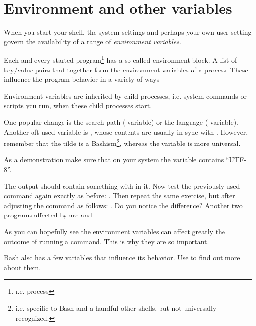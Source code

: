 \documentclass{olli-handout}
\begin{document}
\section{Environment and other variables}\label{env_vars}

\begin{refmanbash}
\end{refmanbash}

When you start your shell, the system settings and perhaps your own user setting govern the availability of a range of \emph{environment variables}.

\begin{hintbox}
{\olliHandLeft} Each and every started program\footnote{i.e. process} has a so-called environment block. A list of key/value pairs that together form the environment variables of a process. These influence the program behavior in a variety of ways.

Environment variables are inherited by child processes, i.e. system commands or scripts you run, when these child processes start.

One popular change is the search path (\label{path_var} variable) or the language ( variable). Another oft used variable is , whose contents are usually in sync with \TT{\mytilde}. However, remember that the tilde is a Bashism\footnote{i.e. specific to Bash and a handful other shells, but not universally recognized.}, whereas the  variable is more universal.
\end{hintbox}

As a demonstration make sure that on your system the  variable contains ``UTF-8''.


The output should contain something with  in it. Now test the previously used  command again exactly as before: . Then repeat the same exercise, but after adjusting the command as follows: . Do you notice the difference? Another two programs affected by  are  and .

As you can hopefully see the environment variables can affect greatly the outcome of running a command. This is why they are so important.

Bash also has a few variables that influence its behavior. Use  to find out more about them.
\end{document}
